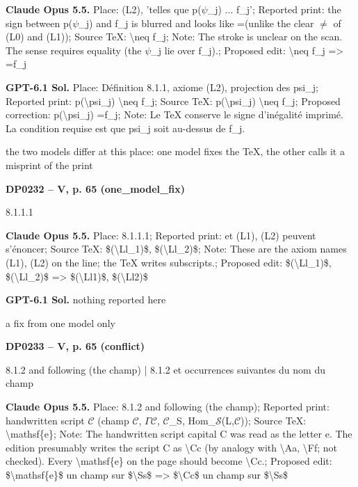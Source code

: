 \textbf{Claude Opus 5.5.} Place: (L2), 'telles que p(\ensuremath{\psi}\_j) ... f\_j'; Reported print: the sign between p(\ensuremath{\psi}\_j) and f\_j is blurred and looks like =\allowbreak  (unlike the clear \ensuremath{\ne} of (L0) and (L1)); Source TeX: \textbackslash{}neq f\_j; Note: The stroke is unclear on the scan. The sense requires equality (the \ensuremath{\psi}\_j lie over f\_j).; Proposed edit: \textbackslash{}neq f\_j =\allowbreak > =\allowbreak  f\_j\par
\textbf{GPT-6.1 Sol.} Place: Définition 8.1.1, axiome (L2), projection des psi\_j; Reported print: p(\textbackslash{}psi\_j) \textbackslash{}neq f\_j; Source TeX: p(\textbackslash{}psi\_j) \textbackslash{}neq f\_j; Proposed correction: p(\textbackslash{}psi\_j) =\allowbreak  f\_j; Note: Le TeX conserve le signe d'inégalité imprimé. La condition requise est que psi\_j soit au-dessus de f\_j.\par
the two models differ at this place: one model fixes the TeX, the other calls it a misprint of the print\par
\par\noindent\hypertarget{DP0232}{}\textbf{DP0232 -- V, p. 65 (one\_model\_fix)}\par
8.1.1.1\par
\textbf{Claude Opus 5.5.} Place: 8.1.1.1; Reported print: et (L1), (L2) peuvent s'énoncer; Source TeX: \$(\textbackslash{}Ll\_1)\$,   \$(\textbackslash{}Ll\_2)\$; Note: These are the axiom names (L1), (L2) on the line; the TeX writes subscripts.; Proposed edit: \$(\textbackslash{}Ll\_1)\$,   \$(\textbackslash{}Ll\_2)\$ =\allowbreak > \$(\textbackslash{}Ll1)\$,   \$(\textbackslash{}Ll2)\$\par
\textbf{GPT-6.1 Sol.} nothing reported here\par
a fix from one model only\par
\par\noindent\hypertarget{DP0233}{}\textbf{DP0233 -- V, p. 65 (conflict)}\par
8.1.2 and following (the champ) | 8.1.2 et occurrences suivantes du nom du champ\par
\textbf{Claude Opus 5.5.} Place: 8.1.2 and following (the champ); Reported print: handwritten script \ensuremath{𝒞} (champ \ensuremath{𝒞}, \ensuremath{\Gamma}\ensuremath{𝒞}, \ensuremath{𝒞}\_S, Hom\_\ensuremath{𝒮}(L,\ensuremath{𝒞})); Source TeX: \textbackslash{}mathsf\{e\}; Note: The handwritten script capital C was read as the letter e. The edition presumably writes the script C as \textbackslash{}Cc (by analogy with \textbackslash{}Aa, \textbackslash{}Ff; not checked). Every \textbackslash{}mathsf\{e\} on the page should become \textbackslash{}Cc.; Proposed edit: \$\textbackslash{}mathsf\{e\}\$ un champ sur \$\textbackslash{}Ss\$ =\allowbreak > \$\textbackslash{}Cc\$ un champ sur \$\textbackslash{}Ss\$\par
